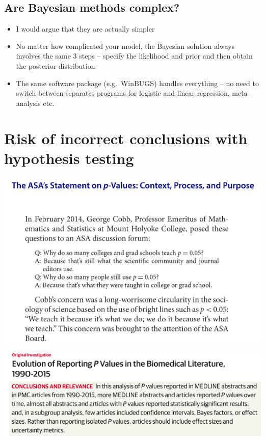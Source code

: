 \documentclass[
]{book}
\providecommand{\tightlist}{%
  \setlength{\itemsep}{0pt}\setlength{\parskip}{0pt}}
\begin{document}
\hypertarget{are-bayesian-methods-complex}{%
\subsection{Are Bayesian methods complex?}\label{are-bayesian-methods-complex}}

\begin{itemize}
\tightlist
\item
  I would argue that they are actually simpler
\item
  No matter how complicated your model, the Bayesian solution always involves the same 3 steps -- specify the likelihood and prior and then obtain the posterior distribution
\item
  The same software package (e.g.~WinBUGS) handles everything -- no need to switch between separates programs for logistic and linear regression, meta-analysis etc.
\end{itemize}

\hypertarget{risk-of-incorrect-conclusions-with-hypothesis-testing}{%
\section{Risk of incorrect conclusions with hypothesis testing}\label{risk-of-incorrect-conclusions-with-hypothesis-testing}}

\includegraphics[width=1\linewidth]{./6_49}

\includegraphics[width=1\linewidth]{./6_50}
\end{document}
